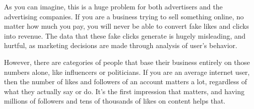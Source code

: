 As you can imagine, this is a huge problem for both advertisers and the advertising companies. If you are a business trying to sell something online, no matter how much you pay, you will never be able to convert fake likes and clicks into revenue. The data that these fake clicks generate is hugely misleading, and hurtful, as marketing decisions are made through analysis of user's behavior.

However, there are categories of people that base their business entirely on those numbers alone, like influencers or politicians. If you are an average internet user, then the number of likes and followers of an account matters a lot, regardless of what they actually say or do. It's the first impression that matters, and having millions of followers and tens of thousands of likes on content helps that.
